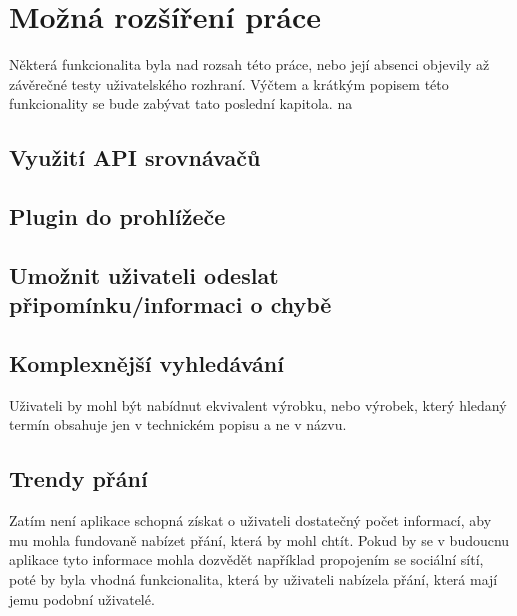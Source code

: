 \chapter{Možná rozšíření práce}
Některá funkcionalita byla nad rozsah této práce, nebo její absenci objevily až závěrečné testy uživatelského rozhraní. Výčtem a krátkým popisem této funkcionality se bude zabývat tato poslední kapitola.
 na

\section{Využití API srovnávačů}

\section{Plugin do prohlížeče}

\section{Umožnit uživateli odeslat připomínku/informaci o chybě}

\section{Komplexnější vyhledávání}
Uživateli by mohl být nabídnut ekvivalent výrobku, nebo výrobek, který hledaný termín obsahuje jen v technickém popisu a ne v názvu.

\section{Trendy přání}
Zatím není aplikace schopná získat o uživateli dostatečný počet informací, aby mu mohla fundovaně nabízet přání, která by mohl chtít. Pokud by se v budoucnu aplikace tyto informace mohla dozvědět například propojením se sociální sítí, poté by byla vhodná funkcionalita, která by uživateli nabízela přání, která mají jemu podobní uživatelé.
